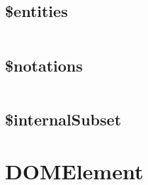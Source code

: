 \begin{lstlisting}[language=PHP]

\end{lstlisting}

\subsection{\$entities}



\begin{lstlisting}[language=PHP]

\end{lstlisting}

\subsection{\$notations}


\begin{lstlisting}[language=PHP]

\end{lstlisting}

\subsection{\$internalSubset}

\section{DOMElement}


